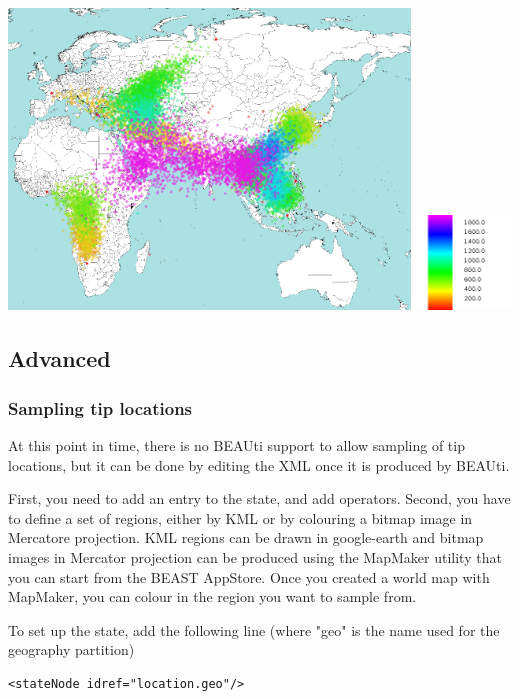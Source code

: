 \documentclass{article}
\begin{document}
\includegraphics[width=0.8\textwidth]{figures/heatmap}
\includegraphics[width=0.19\textwidth]{figures/legend}


\subsection*{Advanced}
\subsubsection*{Sampling tip locations}
At this point in time, there is no BEAUti support to allow sampling of tip locations, but it can be done by editing the XML once it is produced by BEAUti.




First, you need to add an entry to the state, and add operators.
Second, you have to define a set of regions, either by KML or by colouring a bitmap image in Mercatore projection. KML regions can be drawn in google-earth and bitmap images in Mercator projection can be produced using the MapMaker utility that you can start from the BEAST AppStore. Once you created a world map with MapMaker, you can colour in the region you want to sample from.

To set up the state, add the following line (where "geo" is the name used for the geography partition)

\begin{verbatim}
<stateNode idref="location.geo"/>
\end{verbatim}
\end{document}

